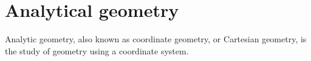 \chapter{Analytical geometry}

Analytic geometry, also known as coordinate geometry, or Cartesian geometry,
is the study of geometry using a coordinate system.



